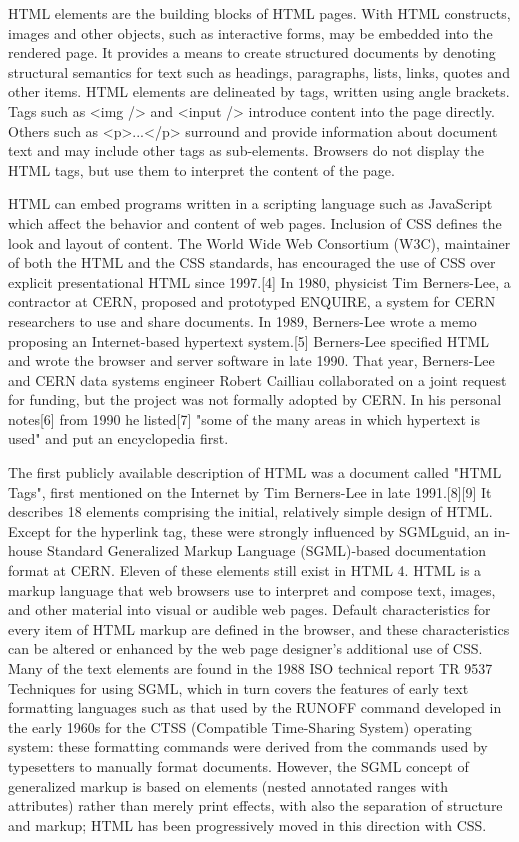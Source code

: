 \documentclass[a4paper,12pt]{article}
\begin{document}
HTML elements are the building blocks of HTML pages. With HTML constructs, images and other objects, such as interactive forms, may be embedded into the rendered page. It provides a means to create structured documents by denoting structural semantics for text such as headings, paragraphs, lists, links, quotes and other items. HTML elements are delineated by tags, written using angle brackets. Tags such as <img /> and <input /> introduce content into the page directly. Others such as <p>...</p> surround and provide information about document text and may include other tags as sub-elements. Browsers do not display the HTML tags, but use them to interpret the content of the page.

HTML can embed programs written in a scripting language such as JavaScript which affect the behavior and content of web pages. Inclusion of CSS defines the look and layout of content. The World Wide Web Consortium (W3C), maintainer of both the HTML and the CSS standards, has encouraged the use of CSS over explicit presentational HTML since 1997.[4]
In 1980, physicist Tim Berners-Lee, a contractor at CERN, proposed and prototyped ENQUIRE, a system for CERN researchers to use and share documents. In 1989, Berners-Lee wrote a memo proposing an Internet-based hypertext system.[5] Berners-Lee specified HTML and wrote the browser and server software in late 1990. That year, Berners-Lee and CERN data systems engineer Robert Cailliau collaborated on a joint request for funding, but the project was not formally adopted by CERN. In his personal notes[6] from 1990 he listed[7] "some of the many areas in which hypertext is used" and put an encyclopedia first.

The first publicly available description of HTML was a document called "HTML Tags", first mentioned on the Internet by Tim Berners-Lee in late 1991.[8][9] It describes 18 elements comprising the initial, relatively simple design of HTML. Except for the hyperlink tag, these were strongly influenced by SGMLguid, an in-house Standard Generalized Markup Language (SGML)-based documentation format at CERN. Eleven of these elements still exist in HTML 4.
\newpage
HTML is a markup language that web browsers use to interpret and compose text, images, and other material into visual or audible web pages. Default characteristics for every item of HTML markup are defined in the browser, and these characteristics can be altered or enhanced by the web page designer's additional use of CSS. Many of the text elements are found in the 1988 ISO technical report TR 9537 Techniques for using SGML, which in turn covers the features of early text formatting languages such as that used by the RUNOFF command developed in the early 1960s for the CTSS (Compatible Time-Sharing System) operating system: these formatting commands were derived from the commands used by typesetters to manually format documents. However, the SGML concept of generalized markup is based on elements (nested annotated ranges with attributes) rather than merely print effects, with also the separation of structure and markup; HTML has been progressively moved in this direction with CSS.
\end{document}
